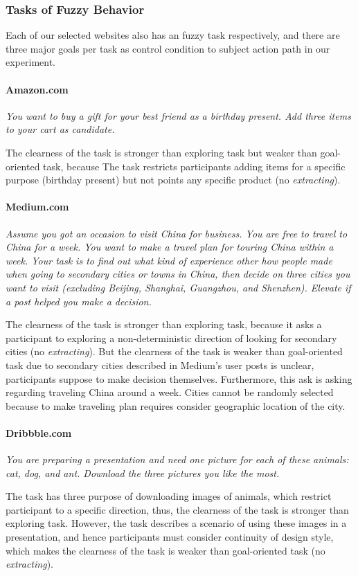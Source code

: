 \subsubsection{Tasks of Fuzzy Behavior}

Each of our selected websites also has an fuzzy task respectively, and there are three major goals per task
as control condition to subject action path in our experiment.

\paragraph{Amazon.com} \emph{You want to buy a gift for your best friend as a birthday present.
        Add three items to your cart as candidate.}

The clearness of the task is stronger than exploring task but weaker than goal-oriented task, because
The task restricts participants adding items for a specific purpose (birthday present) but not points
any specific product (no \emph{extracting}).

\paragraph{Medium.com} \emph{Assume you got an occasion to visit China for business. 
        You are free to travel to China for a week. 
        You want to make a travel plan for touring China within a week. Your task is to find out what kind 
        of experience other how people made when going to secondary cities or towns in China, then decide 
        on three cities you want to visit (excluding  Beijing, Shanghai, Guangzhou, and Shenzhen). 
        Elevate if a post helped you make a decision.}

The clearness of the task is stronger than exploring task, because it asks a participant 
to exploring a non-deterministic direction of looking for secondary cities (no \emph{extracting}).
But the clearness of the task is weaker than goal-oriented task due to secondary cities described
in Medium's user posts is unclear, participants suppose to make decision themselves.
Furthermore, this ask is asking regarding traveling China around a week. Cities cannot be randomly
selected because to make traveling plan requires consider geographic location of the city.

\paragraph{Dribbble.com} \emph{You are preparing a presentation and need one picture for each of these animals: 
    cat, dog, and ant. Download the three pictures you like the most.}

The task has three purpose of downloading images of animals, which restrict participant to a specific direction,
thus, the clearness of the task is stronger than exploring task. However, the task describes a scenario of using
these images in a presentation, and hence participants must consider continuity of design style, which makes
the clearness of the task is weaker than goal-oriented task (no \emph{extracting}).

\cleardoublepage